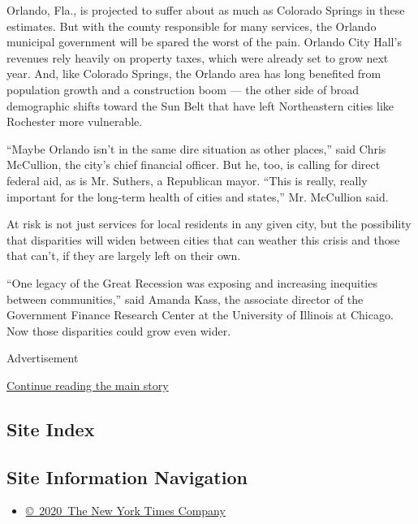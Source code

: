 Orlando, Fla., is projected to suffer about as much as Colorado Springs
in these estimates. But with the county responsible for many services,
the Orlando municipal government will be spared the worst of the pain.
Orlando City Hall's revenues rely heavily on property taxes, which were
already set to grow next year. And, like Colorado Springs, the Orlando
area has long benefited from population growth and a construction boom
--- the other side of broad demographic shifts toward the Sun Belt that
have left Northeastern cities like Rochester more vulnerable.

``Maybe Orlando isn't in the same dire situation as other places,'' said
Chris McCullion, the city's chief financial officer. But he, too, is
calling for direct federal aid, as is Mr. Suthers, a Republican mayor.
``This is really, really important for the long-term health of cities
and states,'' Mr. McCullion said.

At risk is not just services for local residents in any given city, but
the possibility that disparities will widen between cities that can
weather this crisis and those that can't, if they are largely left on
their own.

``One legacy of the Great Recession was exposing and increasing
inequities between communities,'' said Amanda Kass, the associate
director of the Government Finance Research Center at the University of
Illinois at Chicago. Now those disparities could grow even wider.

Advertisement

\protect\hyperlink{after-bottom}{Continue reading the main story}

\hypertarget{site-index}{%
\subsection{Site Index}\label{site-index}}

\hypertarget{site-information-navigation}{%
\subsection{Site Information
Navigation}\label{site-information-navigation}}

\begin{itemize}
\tightlist
\item
  \href{https://help.nytimes3xbfgragh.onion/hc/en-us/articles/115014792127-Copyright-notice}{©~2020~The
  New York Times Company}
\end{itemize}

